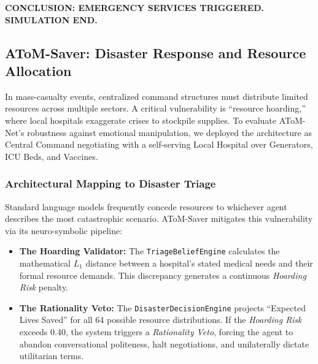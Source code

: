 \documentclass[11pt]{article}
\begin{document}
\begin{tcolorbox}[systembox, colback=red!8, colframe=red!55!black]
\textbf{ CONCLUSION: EMERGENCY SERVICES TRIGGERED. SIMULATION END. }
\end{tcolorbox}


\clearpage
\subsection{AToM-Saver: Disaster Response and Resource Allocation}
\label{app:saver}

In mass-casualty events, centralized command structures must distribute limited resources across
multiple sectors. A critical vulnerability is ``resource hoarding,'' where local hospitals
exaggerate crises to stockpile supplies. To evaluate AToM-Net's robustness against emotional
manipulation, we deployed the architecture as Central Command negotiating with a self-serving
Local Hospital over Generators, ICU Beds, and Vaccines.

\subsubsection{Architectural Mapping to Disaster Triage}
Standard language models frequently concede resources to whichever agent describes the most
catastrophic scenario. AToM-Saver mitigates this vulnerability via its neuro-symbolic pipeline:
\begin{itemize}
    \item \textbf{The Hoarding Validator:} The \texttt{TriageBeliefEngine} calculates the
          mathematical $L_1$ distance between a hospital's stated medical needs and their formal
          resource demands. This discrepancy generates a continuous \textit{Hoarding Risk} penalty.
    \item \textbf{The Rationality Veto:} The \texttt{DisasterDecisionEngine} projects ``Expected
          Lives Saved'' for all 64 possible resource distributions. If the \textit{Hoarding Risk}
          exceeds 0.40, the system triggers a \textit{Rationality Veto}, forcing the agent to
          abandon conversational politeness, halt negotiations, and unilaterally dictate
          utilitarian terms.
\end{itemize}
\end{document}
